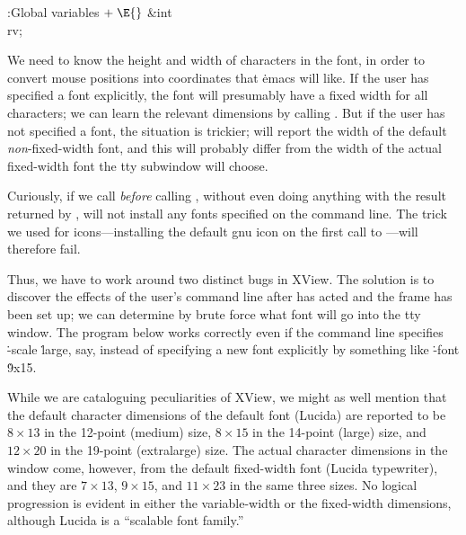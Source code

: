 \B{}:Global variables\X${}\mathrel+\E{}$\6
\&{int} \\{rv};\par
\fi

We need to know the height and width of characters in the font, in order
to convert mouse positions into coordinates that \.{emacs} will like.
If the user has specified a font explicitly, the font will presumably have
a fixed width for all characters; we can learn the relevant dimensions
by calling . But if the user has not specified a font, the
situation is trickier;  will report the width of the default
{\it non\/}-fixed-width font, and this will probably differ from the width of
the actual fixed-width font the tty subwindow will choose.

Curiously, if we call  {\it before\/} calling ,
without even doing anything with the result returned by ,
 will not install any fonts specified on the command line.
The trick we used for icons---installing the default gnu icon on the first
call to ---will therefore fail.

Thus, we have to work around two distinct bugs in XView. The solution
is to discover the effects of the user's command line after 
has acted and the frame has been set up; we can determine by brute force what
font will go into the tty window. The program below works correctly
even if the command line specifies \.{-scale} \.{large}, say, instead of
specifying a new font explicitly by something like \.{-font} \.{9x15}.

While we are cataloguing peculiarities of XView, we might as well mention
that the default character dimensions of the default font (Lucida) are
reported to be $8\times13$ in the 12-point (medium) size, $8\times15$ in the
14-point (large) size, and $12\times20$ in the 19-point (extralarge) size.
The actual character dimensions in the window come, however, from the
default fixed-width font (Lucida typewriter), and they are $7\times13$,
$9\times15$, and $11\times23$ in the same three sizes. No logical progression
is evident in either the variable-width or the fixed-width dimensions,
although Lucida is a ``scalable font family.''

